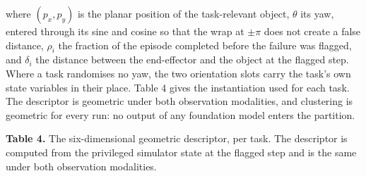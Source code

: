 \documentclass[
  11pt,
]{article}
\begin{document}
where \((p_x, p_y)\) is the planar position of the task-relevant object,
\(\theta\) its yaw, entered through its sine and cosine so that the wrap
at \(\pm\pi\) does not create a false distance, \(\rho_i\) the fraction
of the episode completed before the failure was flagged, and
\(\delta_i\) the distance between the end-effector and the object at the
flagged step. Where a task randomises no yaw, the two orientation slots
carry the task's own state variables in their place. Table 4 gives the
instantiation used for each task. The descriptor is geometric under both
observation modalities, and clustering is geometric for every run: no
output of any foundation model enters the partition.

\textbf{Table 4.} The six-dimensional geometric descriptor, per task.
The descriptor is computed from the privileged simulator state at the
flagged step and is the same under both observation modalities.
\end{document}
